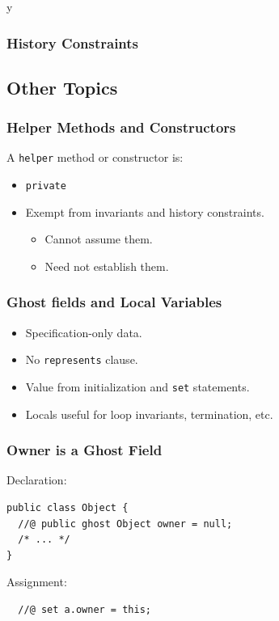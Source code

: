 \if y\MAKEHANDOUTS \documentclass[t,compress,landscape,handout]{beamer}
\begin{document}
\begin{frame}[fragile]
\frametitle{History Constraints}



\end{frame}

\subsection[Other]{Other Topics}

\begin{frame}[fragile]
\frametitle{Helper Methods and Constructors}

A \lstinline!helper! method or constructor is:
\begin{itemize}
\item
\lstinline!private!

\item
Exempt from invariants and history constraints.
\begin{itemize}
\item
Cannot assume them.

\item
Need not establish them.
\end{itemize}
\end{itemize}

\end{frame}

\begin{frame}[fragile]
\frametitle{Ghost fields and Local Variables}
\begin{itemize}
\item
Specification-only data.

\item
No \lstinline!represents! clause.

\item
Value from initialization and \lstinline!set! statements.

\item
Locals useful for loop invariants, termination, etc.
\end{itemize}
\end{frame}

\begin{frame}[fragile]
\frametitle{Owner is a Ghost Field}

Declaration:

\begin{lstlisting}
public class Object {
  //@ public ghost Object owner = null;
  /* ... */
}
\end{lstlisting}

Assignment:
\begin{lstlisting}
  //@ set a.owner = this;
\end{lstlisting}
\end{frame}
\end{document}
